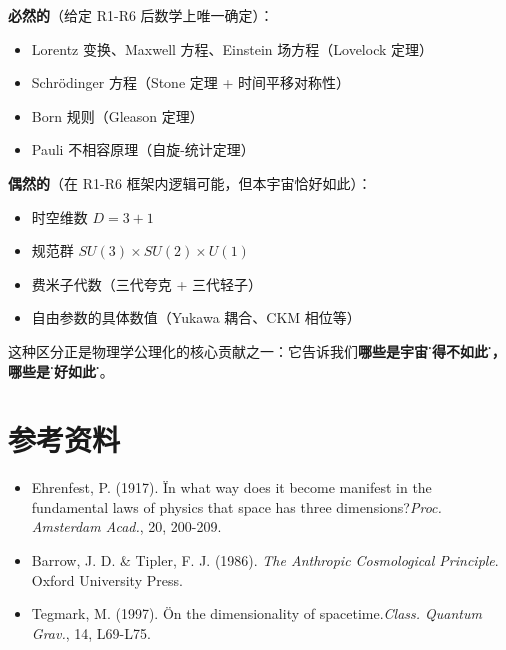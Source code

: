 \begin{insightbox}
  \textbf{必然的}（给定 R1-R6 后数学上唯一确定）：
  \begin{itemize}
    \item Lorentz 变换、Maxwell 方程、Einstein 场方程（Lovelock 定理）
    \item Schr\"odinger 方程（Stone 定理 + 时间平移对称性）
    \item Born 规则（Gleason 定理）
    \item Pauli 不相容原理（自旋-统计定理）
  \end{itemize}

  \textbf{偶然的}（在 R1-R6 框架内逻辑可能，但本宇宙恰好如此）：
  \begin{itemize}
    \item 时空维数 $D=3+1$
    \item 规范群 $SU(3)\times SU(2)\times U(1)$
    \item 费米子代数（三代夸克 + 三代轻子）
    \item 自由参数的具体数值（Yukawa 耦合、CKM 相位等）
  \end{itemize}

  这种区分正是物理学公理化的核心贡献之一：它告诉我们\textbf{哪些是宇宙\"不得不如此\"的，哪些是\"恰好如此\"的}。
\end{insightbox}

\section*{参考资料}

\begin{itemize}
  \item Ehrenfest, P. (1917). \"In what way does it become manifest in the fundamental laws of physics that space has three dimensions?\" \textit{Proc. Amsterdam Acad.}, 20, 200-209.
  \item Barrow, J. D. \& Tipler, F. J. (1986). \textit{The Anthropic Cosmological Principle}. Oxford University Press.
  \item Tegmark, M. (1997). \"On the dimensionality of spacetime.\" \textit{Class. Quantum Grav.}, 14, L69-L75.
\end{itemize}

